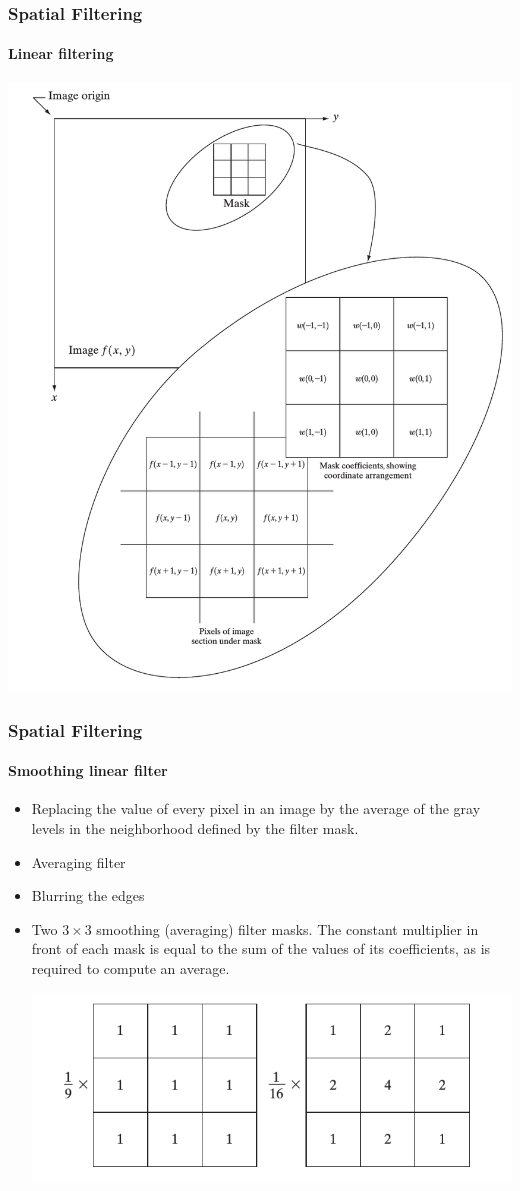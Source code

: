 \documentclass{beamer}
\begin{document}
\begin{frame}
\frametitle{Spatial Filtering}
\framesubtitle{Linear filtering}
\begin{center}
\includegraphics[scale=0.23]{images/Spatial2.png}
\end{center}
\end{frame}
\begin{frame}
\frametitle{Spatial Filtering}
\framesubtitle{Smoothing linear filter}
\begin{itemize}
\item  Replacing the value of every pixel in an image by the average of the gray levels in the neighborhood defined by the filter mask.
\item Averaging filter 
\item {\color{red} Blurring the edges}
\item Two $3\times 3$ smoothing (averaging) filter masks. The constant multiplier in front of each mask is equal to the sum of the values of its coefficients, as is required to compute an average.
\begin{center}\includegraphics[scale=0.4]{images/Spatial3.png}\end{center}
\end{itemize}
\end{frame}
\end{document}
